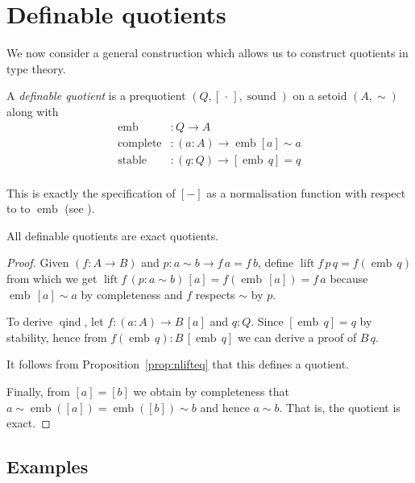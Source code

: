 \documentclass[envcountsame]{llncs}
\newcommand{\dotph}{\,\cdot\,} %
\providecommand{\class}[1]{[#1]}
\DeclareMathOperator{\sound}{sound}
\DeclareMathOperator{\qind}{qind}
\DeclareMathOperator{\emb}{emb}
\DeclareMathOperator{\complete}{complete}
\DeclareMathOperator{\stable}{stable}
\DeclareMathOperator{\lift}{lift}
\renewcommand{\equiv}{=}
\begin{document}
\section{Definable quotients}\label{sec:defquotients}

We now consider a general construction which allows us to construct quotients in type theory.

\begin{definition}\label{def:defquotients}
A \emph{definable quotient} is a prequotient $(Q, \class{\dotph}, \sound)$ on a setoid $(A,\sim)$ along with
\begin{align*}
\emb &: Q \to A\\
\complete &: (a : A) \to \emb {\class a} \sim a\\
\stable &: (q:Q) \to \class{\emb\,q} \equiv q\\
\end{align*}
\end{definition}

This is exactly the specification of  $\class{-}$ as a
normalisation function with respect to to $\emb$ (see \cite{txa:jtait}).

\begin{proposition}\label{prop:definableimpliesexact}
All definable quotients are exact quotients.
\end{proposition}
\begin{proof}

Given $(f\colon A \to B)$ and $p : a\sim b \to f\,a \equiv f\,b$, define $\lift f\, p \,q = f (\emb\,q)$ from which we get $\lift f \,(p : a \sim b)\,\class a\equiv f(\emb\,\class a)\equiv f\,a$ because $\emb\,\class a\sim a$ by completeness and $f$ respects $\sim$ by $p$.

To derive $\qind$, let $f:(a\colon A)\to B\,\class a$ and $q:Q$. Since $ \class{\emb\,q} \equiv q$ by stability, hence from $f (\emb\,q):B\,\class{\emb\,q}$ we can derive a proof of $B\,q$.

It follows from Proposition~\ref{prop:nlifteq} that this defines a quotient.

Finally, from $\class a \equiv \class b$
we obtain by completeness that $a\sim\emb(\class a)\equiv\emb(\class b)\sim b$ and hence $a\sim b$. That is, the quotient is exact.
\end{proof}


\subsection{Examples}\label{sec:dquotients:examples}
\end{document}
